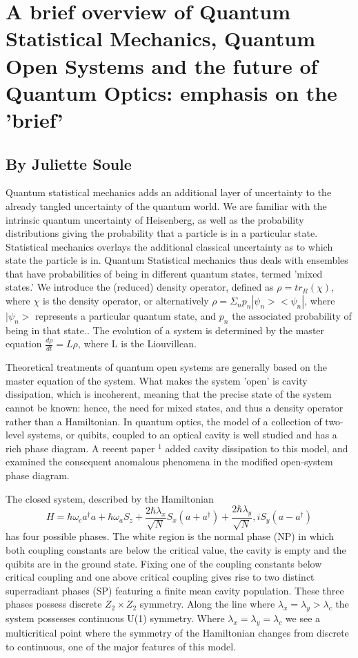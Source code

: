 
\section{A brief overview of Quantum Statistical Mechanics, Quantum Open Systems and the future of Quantum Optics: emphasis on the 'brief'}
\subsection*{By Juliette Soule}
Quantum statistical mechanics adds an additional layer of uncertainty to the already tangled uncertainty of the quantum world. We are familiar with the intrinsic quantum uncertainty of Heisenberg, as well as the probability distributions giving the probability that a particle is in a particular state. Statistical mechanics overlays the additional classical uncertainty as to which state the particle is in. Quantum Statistical mechanics thus deals with ensembles that have probabilities of being in different quantum states, termed 'mixed states.' We introduce the (reduced) density operator, defined as $\rho = tr_{R}(\chi)$, where $\chi$ is the density operator, or alternatively $\rho= \Sigma_{n}p_{n}|\psi_{n}><\psi_{n}|$, where $|\psi_{n}>$ represents a particular quantum state, and $p_{n}$ the associated probability of being in that state.. The evolution of a system is determined by the master equation $\frac{d\rho}{d t} = L\rho$, where L is the Liouvillean. 

Theoretical treatments of quantum open systems are generally based on the master equation of the system. What makes the system 'open' is cavity dissipation, which is incoherent, meaning that the precise state of the system cannot be known: hence, the need for mixed states, and thus a density operator rather than a Hamiltonian. In quantum optics, the model of a collection of two-level systems, or quibits, coupled to an optical cavity is well studied and has a rich phase diagram. A recent paper $^{1}$ added cavity dissipation to this model, and examined the consequent anomalous phenomena in the modified open-system phase diagram. 

The closed system, described by the Hamiltonian 
\begin{equation}
H = \hbar\omega_{c}a^{\dagger}a+\hbar\omega_{a}S_{z}+\frac{2\hbar\lambda_{x}}{\sqrt{N}}S_{x}(a+a^{\dagger})+\frac{2\hbar\lambda_{y}}{\sqrt{N}},iS_{y}(a-a^{\dagger})
\end{equation}
 has four possible phases. The white region is the normal phase (NP) in which both coupling constants are below the critical value, the cavity is empty and the quibits are in the ground state. Fixing one of the coupling constants below critical coupling and one above critical coupling gives rise to two distinct superradiant phases (SP) featuring a finite mean cavity population. These three phases possess discrete $Z_{2}\times Z_{2}$ symmetry. Along the line where $\lambda_{x}=\lambda_{y}>\lambda_{c}$ the system possesses continuous U(1) symmetry. Where $\lambda_{x}=\lambda_{y}=\lambda_{c}$ we see a multicritical point where the symmetry of the Hamiltonian changes from discrete to continuous, one of the major features of this model.
 
